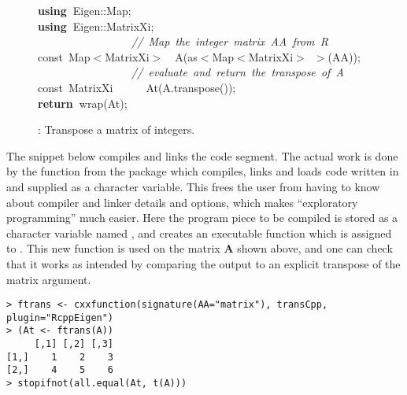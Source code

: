 \documentclass[shortnames,article,nojss]{jss}
\newcommand{\hlstd}[1]{\textcolor[rgb]{0,0,0}{#1}}
\newcommand{\hlslc}[1]{\textcolor[rgb]{0.67,0.13,0.13}{\it{#1}}}
\newcommand{\hlsym}[1]{\textcolor[rgb]{0,0,0}{#1}}
\newcommand{\hlkwa}[1]{\textcolor[rgb]{0.61,0.13,0.93}{\bf{#1}}}
\newcommand{\hlkwb}[1]{\textcolor[rgb]{0.13,0.54,0.13}{#1}}
\newcommand{\hlkwd}[1]{\textcolor[rgb]{0,0,0}{#1}}
\begin{document}
\begin{figure}[htb]
    \noindent
    \ttfamily
    \hlstd{}\hlkwa{using\ }\hlstd{Eigen}\hlsym{::}\hlstd{Map}\hlsym{;}\hspace*{\fill}\\
    \hlstd{}\hlkwa{using\ }\hlstd{Eigen}\hlsym{::}\hlstd{MatrixXi}\hlsym{;}\hspace*{\fill}\\
    \hlstd{}\hlstd{\ \ \ \ \ \ \ \ \ \ \ \ \ \ \ \ \ }\hlstd{}\hlslc{//\ Map\ the\ integer\ matrix\ AA\ from\ R}\hspace*{\fill}\\
    \hlstd{}\hlkwb{const\ }\hlstd{Map}\hlsym{$<$}\hlstd{MatrixXi}\hlsym{$>$}\hlstd{\ \ }\hlsym{}\hlstd{}\hlkwd{A}\hlstd{}\hlsym{(}\hlstd{as}\hlsym{$<$}\hlstd{Map}\hlsym{$<$}\hlstd{MatrixXi}\hlsym{$>$\ $>$(}\hlstd{AA}\hlsym{));}\hspace*{\fill}\\
    \hlstd{}\hlstd{\ \ \ \ \ \ \ \ \ \ \ \ \ \ \ \ \ }\hlstd{}\hlslc{//\ evaluate\ and\ return\ the\ transpose\ of\ A}\hspace*{\fill}\\
    \hlstd{}\hlkwb{const\ }\hlstd{MatrixXi}\hlstd{\ \ \ \ \ \ }\hlstd{}\hlkwd{At}\hlstd{}\hlsym{(}\hlstd{A}\hlsym{.}\hlstd{}\hlkwd{transpose}\hlstd{}\hlsym{());}\hspace*{\fill}\\
    \hlstd{}\hlkwa{return\ }\hlstd{}\hlkwd{wrap}\hlstd{}\hlsym{(}\hlstd{At}\hlsym{);}\hlstd{}\hspace*{\fill}
    \normalfont
  \caption{: Transpose a matrix of integers.}
  \label{trans}
\end{figure}

The  snippet below compiles and links the  code
segment. The actual work is done by the function  from the 
package which compiles, links and loads code written in  and
supplied as a character variable.  This frees the user from having to know about
compiler and linker details and options, which makes ``exploratory
programming'' much easier.  Here the program piece to be compiled is stored
as a character variable named , and  creates
an executable function which is assigned to .  This new function
is used on the matrix $\bm A$ shown above, and one can check that it works as intended
by comparing the output to an explicit transpose of the matrix argument.
\begin{verbatim}
> ftrans <- cxxfunction(signature(AA="matrix"), transCpp, plugin="RcppEigen")
> (At <- ftrans(A))
     [,1] [,2] [,3]
[1,]    1    2    3
[2,]    4    5    6
> stopifnot(all.equal(At, t(A)))
\end{verbatim}
\end{document}
